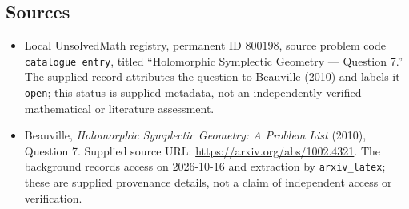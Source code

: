 \documentclass[11pt]{article}
\begin{document}
\subsection{Sources}
\begin{itemize}
\item Local UnsolvedMath registry, permanent ID \(800198\), source problem code \texttt{catalogue entry}, titled ``Holomorphic Symplectic Geometry --- Question 7.'' The supplied record attributes the question to Beauville (2010) and labels it \texttt{open}; this status is supplied metadata, not an independently verified mathematical or literature assessment.
\item Beauville, \emph{Holomorphic Symplectic Geometry: A Problem List} (2010), Question 7. Supplied source URL: \url{https://arxiv.org/abs/1002.4321}. The background records access on 2026-10-16 and extraction by \texttt{arxiv\_latex}; these are supplied provenance details, not a claim of independent access or verification.
\end{itemize}
\end{document}
